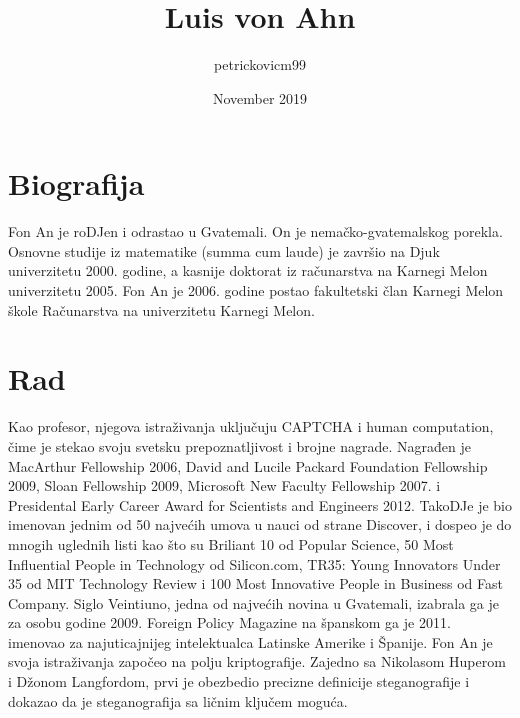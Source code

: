 \documentclass{article}
\title{Luis von Ahn}
\author{petrickovicm99 }
\date{November 2019}
\begin{document}
\maketitle

\section{Biografija}
Fon An je roDJen i odrastao u Gvatemali. On je nemačko-gvatemalskog porekla. 
Osnovne studije iz matematike (summa cum laude) je završio na Djuk univerzitetu 2000. godine, a kasnije doktorat iz računarstva na Karnegi Melon univerzitetu 2005.
Fon An je 2006. godine postao fakultetski član Karnegi Melon škole Računarstva na univerzitetu Karnegi Melon.

\section{Rad}
Kao profesor, njegova istraživanja uključuju CAPTCHA i human computation, čime je stekao svoju svetsku prepoznatljivost i brojne nagrade. Nagrađen je MacArthur Fellowship 2006, David and Lucile Packard Foundation Fellowship 2009, Sloan Fellowship 2009, Microsoft New Faculty Fellowship 2007. i Presidental Early Career Award for Scientists and Engineers 2012. TakoDJe je bio imenovan jednim od 50 najvećih umova u nauci od strane Discover, i dospeo je do mnogih uglednih listi kao što su Briliant 10 od Popular Science, 50 Most Influential People in Technology od Silicon.com, TR35: Young Innovators Under 35 od MIT Technology Review i 100 Most Innovative People in Business od Fast Company. 
Siglo Veintiuno, jedna od najvećih novina u Gvatemali, izabrala ga je za osobu godine 2009. Foreign Policy Magazine na španskom ga je 2011. imenovao za najuticajnijeg intelektualca Latinske Amerike i Španije. 
Fon An je svoja istraživanja započeo na polju kriptografije. Zajedno sa Nikolasom Huperom i Džonom Langfordom, prvi je obezbedio precizne definicije steganografije i dokazao da je steganografija sa ličnim ključem moguća.
\end{document}
